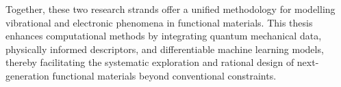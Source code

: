 \vspace{1em}
Together, these two research strands offer a unified methodology for modelling vibrational and electronic phenomena in functional materials. This thesis enhances computational methods by integrating quantum mechanical data, physically informed descriptors, and differentiable machine learning models, thereby facilitating the systematic exploration and rational design of next-generation functional materials beyond conventional constraints.




